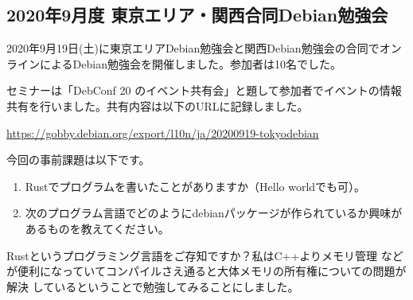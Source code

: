 \documentclass[mingoth,a4paper]{jsarticle}
\begin{document}

\subsection{2020年9月度 東京エリア・関西合同Debian勉強会}

2020年9月19日(土)に東京エリアDebian勉強会と関西Debian勉強会の合同でオンラインによるDebian勉強会を開催しました。参加者は10名でした。

セミナーは「DebConf 20 のイベント共有会」と題して参加者でイベントの情報共有を行いました。共有内容は以下のURLに記録しました。

\url{https://gobby.debian.org/export/l10n/ja/20200919-tokyodebian}


今回の事前課題は以下です。

\begin{enumerate}
 \item Rustでプログラムを書いたことがありますか（Hello worldでも可）。
 \item 次のプログラム言語でどのようにdebianパッケージが作られているか興味があるものを教えてください。
\end{enumerate}


\begin{multicols}{2}
{\small

}
\end{multicols}

%
%
%
%





Rust\cite{rustsite}というプログラミング言語をご存知ですか？私はC++よりメモリ管理
などが便利になっていてコンパイルさえ通ると大体メモリの所有権についての問題が解決
しているということで勉強してみることにしました。
\end{document}
